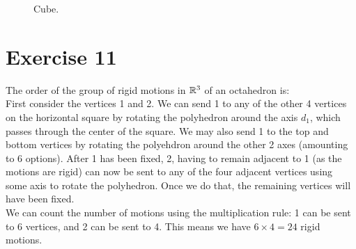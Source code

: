 \documentclass[12pt]{article}
\begin{document}
\begin{figure}[H]

        \caption{\label{fig:figure1} Cube.}
    \end{figure}


    \section*{Exercise 11}
    The order of the group of rigid motions in $\mathbb{R}^3$ of an octahedron is: \\
    First consider the vertices 1 and 2.
    We can send 1 to any of the other 4 vertices on the horizontal square by
    rotating the polyhedron around the axis $d_1$, which passes through
    the center of the square. We may also send 1 to the top and bottom vertices
    by rotating the polyehdron around the other 2 axes (amounting to 6 options).
    After 1 has been fixed, 2, having to remain adjacent to 1 (as the
    motions are rigid) can now be sent to any of the four adjacent vertices
    using some axis to rotate the polyhedron. Once we do that, the
    remaining vertices will have been fixed. \\
    We can count the number of motions using the multiplication rule:
    1 can be sent to 6 vertices, and 2 can be sent to 4. This means we
    have $6 \times 4 = 24$ rigid motions. 
\end{document}
